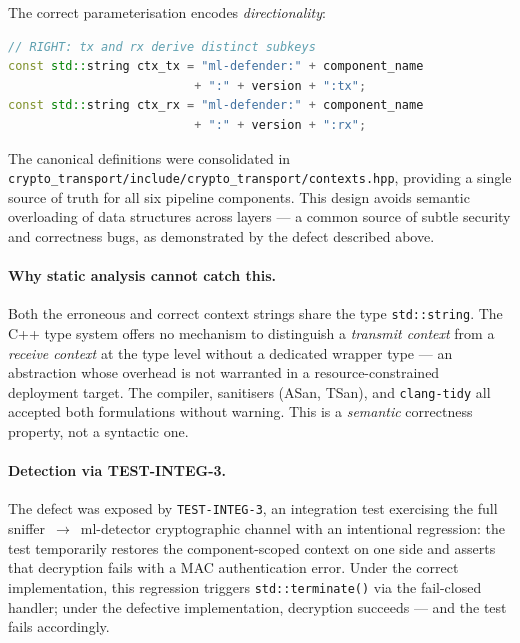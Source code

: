 \documentclass[11pt,a4paper]{article}
\begin{document}
    The correct parameterisation encodes \emph{directionality}:

    \begin{lstlisting}[language=C++, caption={Correct HKDF context --- channel-scoped},
        basicstyle=\ttfamily\small, breaklines=true]
// RIGHT: tx and rx derive distinct subkeys
const std::string ctx_tx = "ml-defender:" + component_name
                          + ":" + version + ":tx";
const std::string ctx_rx = "ml-defender:" + component_name
                          + ":" + version + ":rx";
    \end{lstlisting}

    The canonical definitions were consolidated in
    \texttt{crypto\_transport/include/crypto\_transport/contexts.hpp},
    providing a single source of truth for all six pipeline components.
    This design avoids semantic overloading of data structures across layers ---
    a common source of subtle security and correctness bugs, as demonstrated by
    the defect described above.

    \paragraph{Why static analysis cannot catch this.}
    Both the erroneous and correct context strings share the type
    \texttt{std::string}. The C++ type system offers no mechanism to distinguish
    a \emph{transmit context} from a \emph{receive context} at the type level
    without a dedicated wrapper type --- an abstraction whose overhead is not
    warranted in a resource-constrained deployment target. The compiler,
    sanitisers (ASan, TSan), and \texttt{clang-tidy} all accepted both
    formulations without warning. This is a \emph{semantic} correctness
    property, not a syntactic one.

    \paragraph{Detection via TEST-INTEG-3.}
    The defect was exposed by \texttt{TEST-INTEG-3}, an integration test
    exercising the full sniffer~$\to$~ml-detector cryptographic channel with an
    intentional regression: the test temporarily restores the component-scoped
    context on one side and asserts that decryption fails with a MAC
    authentication error. Under the correct implementation, this regression
    triggers \texttt{std::terminate()} via the fail-closed handler; under the
    defective implementation, decryption succeeds --- and the test fails
    accordingly.
\end{document}
